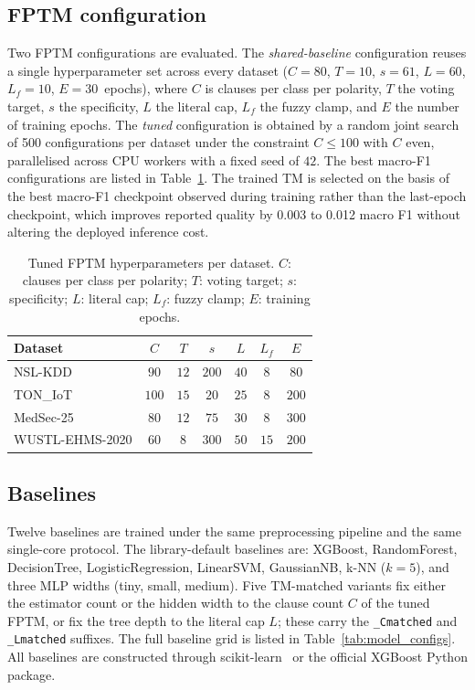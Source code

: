 \documentclass[journal,10pt]{IEEEtran}
\begin{document}
\subsection{FPTM configuration}
\label{sec:fptm-config}
Two FPTM configurations are evaluated. The \emph{shared-baseline}
configuration reuses a single hyperparameter set across every dataset
($C{=}80$, $T{=}10$, $s{=}61$, $L{=}60$, $L_f{=}10$, $E{=}30$~epochs),
where $C$ is clauses per class per polarity, $T$ the voting target,
$s$ the specificity, $L$ the literal cap, $L_f$ the fuzzy clamp,
and $E$ the number of training epochs. The \emph{tuned} configuration
is obtained by a random joint search of 500 configurations per
dataset under the constraint $C \le 100$ with $C$ even, parallelised
across CPU workers with a fixed seed of $42$. The best macro-F1
configurations are listed in Table~\ref{tab:tm_hparams}. The trained
TM is selected on the basis of the best macro-F1 checkpoint observed
during training rather than the last-epoch checkpoint, which improves
reported quality by 0.003 to 0.012 macro F1 without altering the
deployed inference cost.

\begin{table}[t]
\centering
\caption{Tuned FPTM hyperparameters per dataset. $C$: clauses per
         class per polarity; $T$: voting target; $s$: specificity;
         $L$: literal cap; $L_f$: fuzzy clamp; $E$: training epochs.}
\label{tab:tm_hparams}
\begin{tabular}{lcccccc}
\toprule
\textbf{Dataset} & $C$ & $T$ & $s$ & $L$ & $L_f$ & $E$ \\
\midrule
NSL-KDD         & $90$  & $12$ & $200$ & $40$ & $8$  & $80$  \\
TON\_IoT        & $100$ & $15$ & $20$  & $25$ & $8$  & $200$ \\
MedSec-25       & $80$  & $12$ & $75$  & $30$ & $8$  & $300$ \\
WUSTL-EHMS-2020 & $60$  & $8$  & $300$ & $50$ & $15$ & $200$ \\
\bottomrule
\end{tabular}
\end{table}

\subsection{Baselines}
\label{sec:baselines}
Twelve baselines are trained under the same preprocessing pipeline
and the same single-core protocol. The library-default baselines are:
XGBoost, RandomForest, DecisionTree, LogisticRegression, LinearSVM,
GaussianNB, k-NN ($k=5$), and three MLP widths (tiny, small, medium).
Five TM-matched variants fix either the estimator count or the hidden
width to the clause count $C$ of the tuned FPTM, or fix the tree
depth to the literal cap $L$; these carry the \texttt{\_Cmatched}
and \texttt{\_Lmatched} suffixes. The full baseline grid is listed
in Table~\ref{tab:model_configs}. All baselines are constructed
through scikit-learn~\cite{pedregosa2011scikit} or the official
XGBoost Python package.
\end{document}

